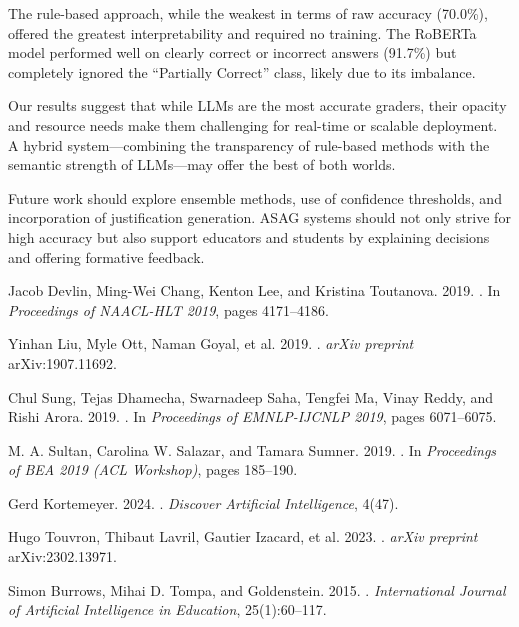 \documentclass[11pt]{article}
\begin{document}
The rule-based approach, while the weakest in terms of raw accuracy (70.0\%), offered the greatest interpretability and required no training. The RoBERTa model performed well on clearly correct or incorrect answers (91.7\%) but completely ignored the “Partially Correct” class, likely due to its imbalance.

Our results suggest that while LLMs are the most accurate graders, their opacity and resource needs make them challenging for real-time or scalable deployment. A hybrid system—combining the transparency of rule-based methods with the semantic strength of LLMs—may offer the best of both worlds.

Future work should explore ensemble methods, use of confidence thresholds, and incorporation of justification generation. ASAG systems should not only strive for high accuracy but also support educators and students by explaining decisions and offering formative feedback.

\newpage


\begin{thebibliography}{}

Jacob Devlin, Ming-Wei Chang, Kenton Lee, and Kristina Toutanova. 2019. 
. 
\newblock In \textit{Proceedings of NAACL-HLT 2019}, pages 4171--4186.

Yinhan Liu, Myle Ott, Naman Goyal, et al. 2019. 
. 
\newblock \textit{arXiv preprint} arXiv:1907.11692.

Chul Sung, Tejas Dhamecha, Swarnadeep Saha, Tengfei Ma, Vinay Reddy, and Rishi Arora. 2019.
. 
\newblock In \textit{Proceedings of EMNLP-IJCNLP 2019}, pages 6071--6075.

M. A. Sultan, Carolina W. Salazar, and Tamara Sumner. 2019.
. 
\newblock In \textit{Proceedings of BEA 2019 (ACL Workshop)}, pages 185--190.

Gerd Kortemeyer. 2024.
. 
\newblock \textit{Discover Artificial Intelligence}, 4(47).

Hugo Touvron, Thibaut Lavril, Gautier Izacard, et al. 2023.
. 
\newblock \textit{arXiv preprint} arXiv:2302.13971.

Simon Burrows, Mihai D. Tompa, and Goldenstein. 2015.
. 
\newblock \textit{International Journal of Artificial Intelligence in Education}, 25(1):60--117.

\end{thebibliography}
\end{document}
